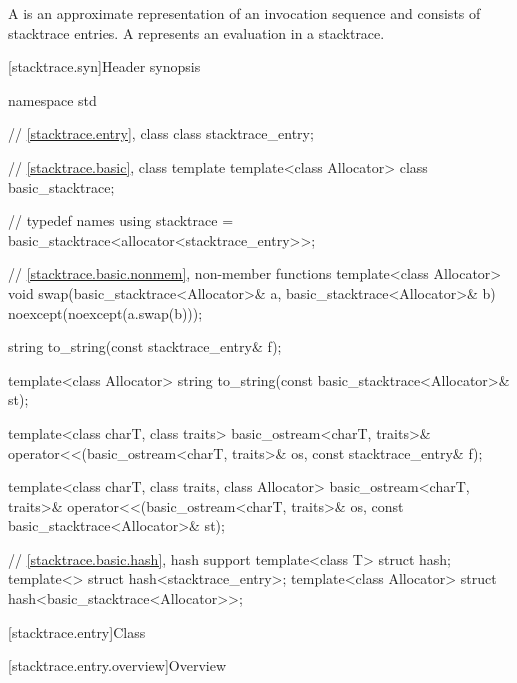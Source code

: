 \pnum
A  is an approximate representation of
an invocation sequence and consists of stacktrace entries.
A  represents an evaluation in a stacktrace.

[stacktrace.syn]{Header  synopsis}

%
\begin{codeblock}
namespace std {
  // \ref{stacktrace.entry}, class 
  class stacktrace_entry;

  // \ref{stacktrace.basic}, class template 
  template<class Allocator>
    class basic_stacktrace;

  //  typedef names
  using stacktrace = basic_stacktrace<allocator<stacktrace_entry>>;

  // \ref{stacktrace.basic.nonmem}, non-member functions
  template<class Allocator>
    void swap(basic_stacktrace<Allocator>& a, basic_stacktrace<Allocator>& b)
      noexcept(noexcept(a.swap(b)));

  string to_string(const stacktrace_entry& f);

  template<class Allocator>
    string to_string(const basic_stacktrace<Allocator>& st);

  template<class charT, class traits>
    basic_ostream<charT, traits>&
      operator<<(basic_ostream<charT, traits>& os, const stacktrace_entry& f);

  template<class charT, class traits, class Allocator>
    basic_ostream<charT, traits>&
      operator<<(basic_ostream<charT, traits>& os, const basic_stacktrace<Allocator>& st);

  // \ref{stacktrace.basic.hash}, hash support
  template<class T> struct hash;
  template<> struct hash<stacktrace_entry>;
  template<class Allocator> struct hash<basic_stacktrace<Allocator>>;
}
\end{codeblock}

[stacktrace.entry]{Class }

[stacktrace.entry.overview]{Overview}

